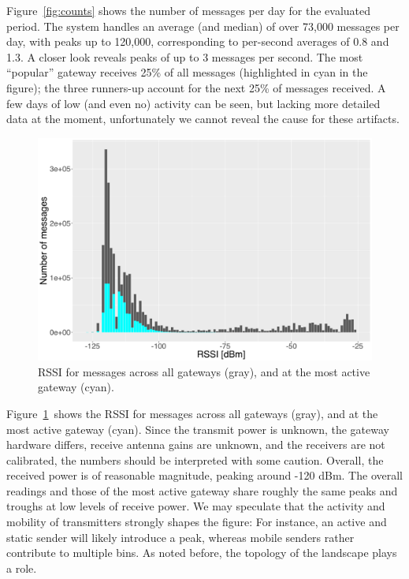 Figure~\ref{fig:counts} shows the number of messages per day for the
evaluated period. The system handles an average (and median) of over
73,000 messages per day, with peaks up to 120,000, corresponding to
per-second averages of 0.8 and 1.3. A closer look reveals peaks
of up to 3 messages per second. The most ``popular'' gateway
receives 25\% of all messages (highlighted in cyan in the figure);
the three runners-up account for
the next 25\% of messages received.
A few days of low (and even no) activity can be seen, but lacking
more detailed data at the moment, unfortunately we cannot reveal the
cause for these artifacts.

\begin{figure}
  \centering
  \includegraphics[width=\columnwidth]{figures/rssi.pdf}
  \caption{\acrshort{RSSI} for messages across all gateways (gray), and at the most active gateway (cyan).}
  \label{fig:rssi}
\end{figure}

Figure~\ref{fig:rssi} shows the \acrfull{RSSI} for messages across all
gateways (gray), and at the most active gateway (cyan).
Since the transmit power is unknown, the gateway hardware differs,
receive antenna gains are unknown, and the receivers are not calibrated,
the numbers should be interpreted with some caution.
Overall, the received power is of reasonable magnitude,
peaking around -120 dBm. The overall readings and those of
the most active gateway share roughly the same peaks and troughs
at low levels of receive power. We may speculate that the activity
and mobility of transmitters strongly shapes the figure: For instance,
an active and static sender will likely introduce a peak, whereas
mobile senders rather contribute to multiple bins. As noted before,
the topology of the landscape plays a role.


